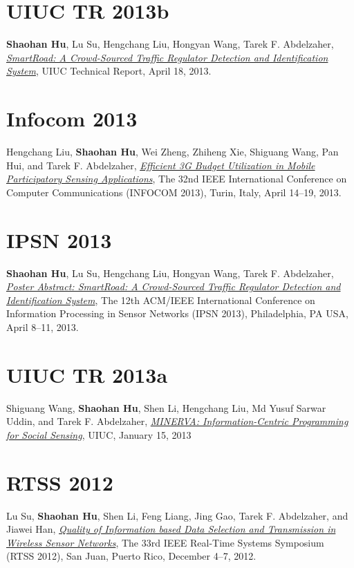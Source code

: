 \section{\sc UIUC TR 2013b}\hypertarget{hu2013uiuc1}{} \textbf{Shaohan Hu}, Lu Su, Hengchang Liu, Hongyan Wang, Tarek F. Abdelzaher, \href{https://www.ideals.illinois.edu/handle/2142/43856}{\emph{SmartRoad: A Crowd-Sourced Traffic Regulator Detection and Identification System}}, \textsf{UIUC Technical Report}, April 18, 2013.

\section{\sc Infocom 2013}\hypertarget{liu2013infocom}{} Hengchang Liu, \textbf{Shaohan Hu}, Wei Zheng, Zhiheng Xie, Shiguang Wang, Pan Hui, and Tarek F. Abdelzaher, \href{http://ieeexplore.ieee.org/xpl/articleDetails.jsp?arnumber=6566935}{\emph{Efficient 3G Budget Utilization in Mobile Participatory Sensing Applications}}, \textsf{The 32nd IEEE International Conference on Computer Communications (INFOCOM 2013)}, Turin, Italy, April 14--19, 2013.

\section{\sc IPSN 2013}\hypertarget{hu2013ipsn}{} \textbf{Shaohan Hu}, Lu Su, Hengchang Liu, Hongyan Wang, Tarek F. Abdelzaher, \href{http://portal.acm.org/citation.cfm?id=2461433}{\emph{Poster Abstract: SmartRoad: A Crowd-Sourced Traffic Regulator Detection and Identification System}}, \textsf{The 12th ACM/IEEE International Conference on Information Processing in Sensor Networks (IPSN 2013)}, Philadelphia, PA USA, April 8--11, 2013.

\section{\sc UIUC TR 2013a}\hypertarget{wang2013uiuc}{} Shiguang Wang, \textbf{Shaohan Hu}, Shen Li, Hengchang Liu, Md Yusuf Sarwar Uddin, and Tarek F. Abdelzaher, \href{https://www.ideals.illinois.edu/handle/2142/42511}{\emph{MINERVA: Information-Centric Programming for Social Sensing}}, \textsf{UIUC}, January 15, 2013

\section{\sc RTSS 2012}\hypertarget{su2012rtss}{} Lu Su, \textbf{Shaohan Hu}, Shen Li, Feng Liang, Jing Gao, Tarek F. Abdelzaher, and Jiawei Han, \href{http://ieeexplore.ieee.org/xpl/articleDetails.jsp?arnumber=6424815}{\emph{Quality of Information based Data Selection and Transmission in Wireless Sensor Networks}}, \textsf{The 33rd IEEE Real-Time Systems Symposium (RTSS 2012)}, San Juan, Puerto Rico, December 4--7, 2012.

